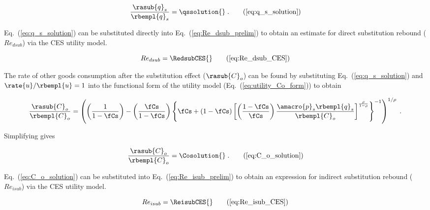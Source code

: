 \begin{equation}
  \frac{\rasub{q}_s}{\rbempl{q}_s} = \qssolution{} \; . \tag{\ref{eq:q_s_solution}}
\end{equation}

Eq.~(\ref{eq:q_s_solution}) can be substituted directly
into Eq.~(\ref{eq:Re_dsub_prelim})
to obtain an estimate for direct substitution rebound ($Re_{dsub}$)
via the CES utility model.

\begin{equation}
  Re_{dsub} = \RedsubCES{} \tag{\ref{eq:Re_dsub_CES}}
\end{equation}

The rate of other goods consumption after the substitution effect ($\rasub{C}_o$) 
can be found by substituting Eq.~(\ref{eq:q_s_solution}) and 
$\rate{u}/\rbempl{u} = 1$ 
into the functional form of the utility model (Eq.~(\ref{eq:utility_Co_form}))
to obtain

\begin{equation}
  \frac{\rasub{C}_o}{\rbempl{C}_o} = \left( \left( \frac{1}{1-\fCs} \right) 
                                     - \left( \frac{\fCs}{1-\fCs} \right)   
              \left\{ \fCs + (1-\fCs)
                  \left[ \left( \frac{1-\fCs}{\fCs} \right) \frac{\amacro{p}_s \rbempl{q}_s}{\rbempl{C}_o}   \right] 
                      ^{\frac{\rho}{1-\rho}} \right\} ^{-1} \right) ^{1/\rho} \; .
\end{equation}

Simplifying gives

\begin{equation}
  \frac{\rasub{C}_o}{\rbempl{C}_o} = \Cosolution{} \; . \tag{\ref{eq:C_o_solution}}
\end{equation}

Eq.~(\ref{eq:C_o_solution}) can be substituted into Eq.~(\ref{eq:Re_isub_prelim})
to obtain an expression for indirect substitution rebound ($Re_{isub}$)
via the CES utility model.

\begin{equation}
  Re_{isub} = \ReisubCES{} \tag{\ref{eq:Re_isub_CES}}
\end{equation}


\subsubsection{\Inceffect{}} 
\label{sec:Re_inc}

